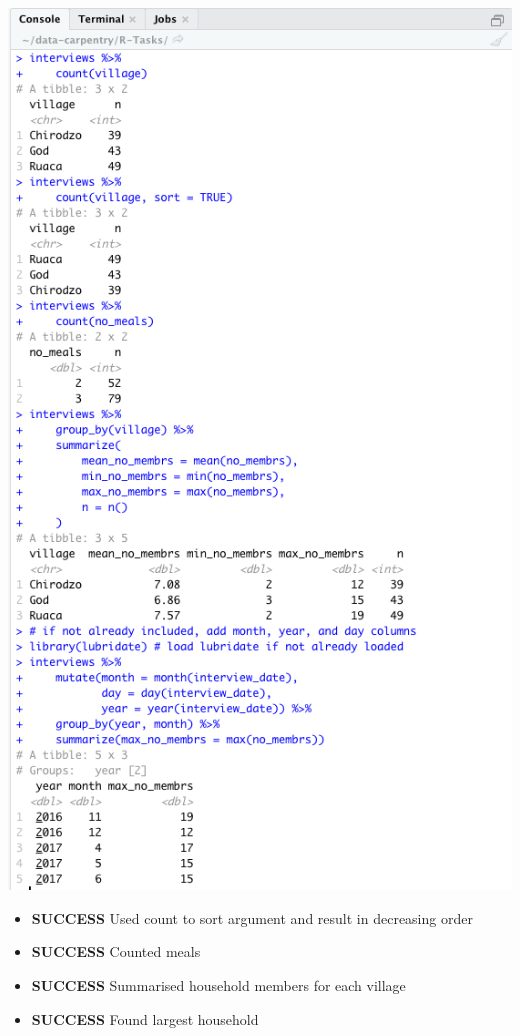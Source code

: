 \documentclass{article}
\begin{document}
\includegraphics[width=\textwidth]{Images/RStudio_16.png}
\begin{itemize}
\item \textbf{SUCCESS} Used count to sort argument and result in decreasing order
\item \textbf{SUCCESS} Counted meals 
\item \textbf{SUCCESS} Summarised household members for each village
\item \textbf{SUCCESS} Found largest household 
\end{itemize}
\end{document}
